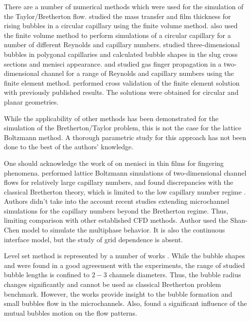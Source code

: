 \documentclass[preprint,12pt]{elsarticle}
\begin{document}
There are a number of numerical methods which
were used for the simulation of the Taylor/Bretherton flow.
\citet{vanbaten-circular} studied the mass transfer and film
thickness for rising bubbles in a circular capillary using the finite volume method.
\citet{kreutzer-pressure-drop} also used the finite volume method to perform
simulations of a circular capillary for a number of different
Reynolds and capillary numbers. \citeauthor{wong-films} \cite{wong-films,wong-pressure} studied
three-dimensional bubbles in
polygonal capillaries and calculated bubble shapes in the
slug cross sections and menisci appearance.
\citet{heil-bretherton} and \citet{ingham-plates} studied gas finger propagation in
a two-dimensional channel for a range of Reynolds and capillary
numbers using the finite element method. \citet{giavedoni-numerical} performed cross validation of the
finite element solution with previously published results.
The solutions were obtained for circular and planar geometries.

While the applicability of other methods has been demonstrated for the
simulation of the Bretherton/Taylor problem, this is not the case for
the lattice Boltzmann method. A thorough parametric study for this approach
has not been done to the best of the authors' knowledge.

One should acknowledge the work of \citet{pagonabarraga-fingers} on menisci
in thin films for fingering phenomena. \citet{sehgal-microchannel} performed lattice Boltzmann
simulations of two-dimensional channel flows for relatively large capillary numbers, and
found discrepancies with the classical Bretherton theory, which
is limited to the low capillary number regime \cite{giavedoni-numerical}. Authors didn't take into
the account recent studies extending microchannel simulations for the capillary numbers
beyond the Bretherton regime. Thus, limiting comparison with other established CFD methods. Author
used the Shan-Chen model \cite{Shan-chen:extended} to simulate the multiphase behavior. It is also
the continuous interface model, but the study of grid dependence is absent.

{\color{red}
Level set method is represented by a number of works \cite{fukugata-levelset,
lakehal-micro, carlson-comparison}. While the bubble shapes and  were found in a good agreeement
with the experiments, the range of studied bubble lengths is confined to $2-3$ channels diameters.
Thus, the bubble radius changes significantly and cannot be used as classical Bretherton problem
benchmark. However, the works provide insight to the bubble formation and small bubbles flow in the
microchannels. Also, \citet{carlson-comparison} found a significant influence of the mutual bubbles
motion on the flow patterns.} 
\end{document}
